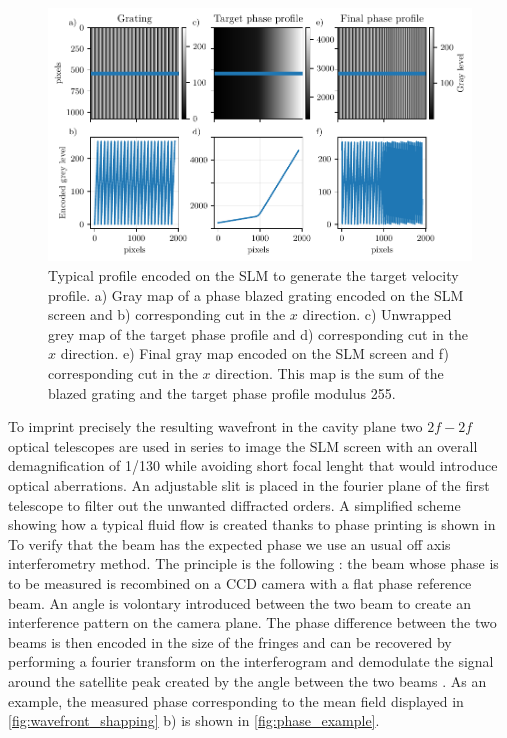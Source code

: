 \begin{figure}
    \centering
    \hspace{-1.4cm}
    \includegraphics[width=1.1\textwidth]{chap3_custom_st/fig/slm_typical.pdf}
    \caption{Typical profile encoded on the SLM to generate the target velocity profile. a) Gray map of a phase blazed grating encoded on the SLM screen and b) corresponding cut in the 
    $x$ direction. c) Unwrapped grey map of the target phase profile and d) corresponding cut in the $x$ direction. e) Final gray map encoded on the SLM screen and f) corresponding cut in the $x$ direction. This map is the sum 
    of the blazed grating and the target phase profile modulus 255.} 
    \label{fig:SLM_profile}
\end{figure}

To imprint precisely the resulting wavefront in the cavity plane two $2f-2f$ optical telescopes are used in series to image the SLM screen with an overall demagnification of 1/130 while avoiding short focal lenght that would introduce optical aberrations.
An adjustable slit is placed in the fourier plane of the first telescope to filter out the unwanted diffracted orders. A simplified scheme showing how a typical fluid flow is created thanks to phase printing is shown in
To verify that the beam has the expected phase we use an usual off axis interferometry method. The principle is the following :
the beam whose phase is to be measured is recombined on a CCD camera with a flat phase reference beam. An angle is volontary introduced between the two beam to create an interference pattern on the camera plane. The phase difference between 
the two beams is then encoded in the size of the fringes and can be recovered by performing a fourier transform on the interferogram and demodulate the signal around the satellite peak created by the angle between the two beams \cite{liebling_complex-wave_2004}.
As an example, the measured phase corresponding to the mean field displayed in \autoref{fig:wavefront_shapping} b) is shown in \autoref{fig:phase_example}.
 
